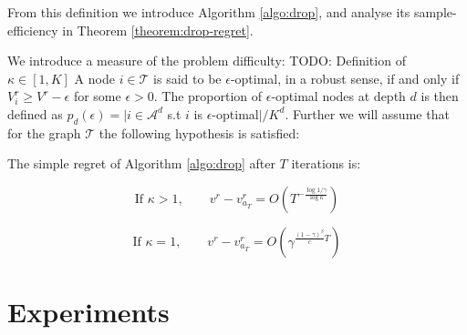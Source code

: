 \documentclass{article}
\begin{document}
From this definition we introduce Algorithm \ref{algo:drop}, and analyse its sample-efficiency in Theorem \ref{theorem:drop-regret}.


We introduce a measure of the problem difficulty: TODO: Definition of $\kappa\in [1, K]$
A node $i\in\mathcal{T}$ is said to be $\epsilon$-optimal, in a robust sense, if and only if $V_i^r \geq V^r - \epsilon$ for some $\epsilon > 0$. The proportion of $\epsilon$-optimal nodes at depth $d$ is then defined as $p_d(\epsilon) = |i \in \mathcal{A}^d$ s.t $i$ is $\epsilon$-optimal$|/K^d$. Further we will assume that for the graph $\mathcal{T}$ the following hypothesis is satisfied:

\begin{theorem}
\label{theorem:drop-regret}
The simple regret of Algorithm \ref{algo:drop} after $T$ iterations is:

\begin{equation}
\text{If } \kappa>1,\qquad 
v^r - v^r_{a_T} = O\left(T^{-\frac{\log 1/\gamma}{\log \kappa}}\right)
\end{equation}

\begin{equation}
\text{If }\kappa=1,\qquad
v^r - v^r_{a_T} = O\left(\gamma^{\frac{(1-\gamma)^\beta}{c}T}\right)
\end{equation}
\end{theorem}

\section{Experiments}
\end{document}
